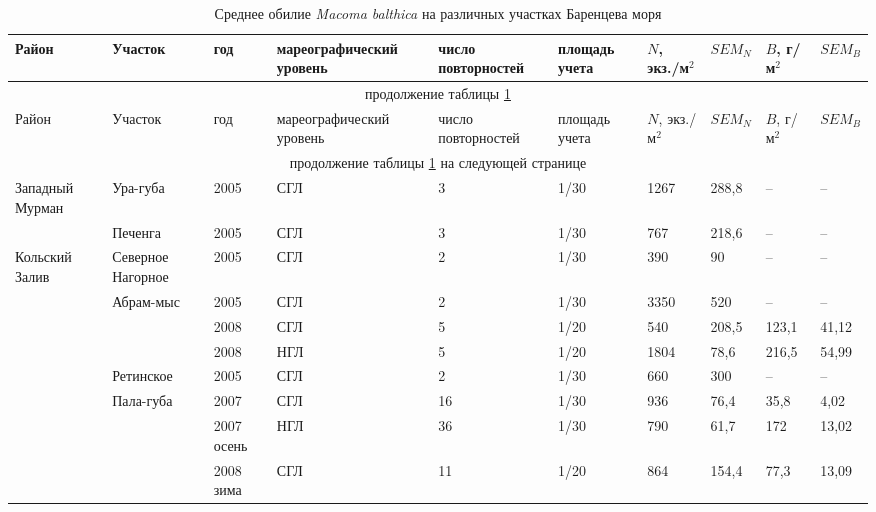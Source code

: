 	\begin{footnotesize}
        \begin{center}
	\begin{longtable}{|p{1.6cm}|p{2.3cm}|p{1cm}|p{1.6cm}|p{1.1cm}|p{1.1cm}|*{4}{p{1cm}|}}
	\caption{Среднее обилие {\it Macoma balthica} на различных участках Баренцева моря}\label{tab:mean_NB_Barents}\\
	\hline
	Район & Участок & год & ма\-ре\-ографи\-ческий уровень & число повторностей & пло\-щадь учета & $N$, экз./м$^2$ & $SEM_N$  & $B$, г/м$^2$ & $SEM_B$
	\\ \hline \endfirsthead
	\hline
	\multicolumn{10}{|c|}{продолжение таблицы \ref{tab:mean_NB_Barents}} \\ \hline
	Район & Участок & год & ма\-ре\-ографи\-ческий уровень & число повторностей & пло\-щадь учета & $N$, экз./м$^2$ & $SEM_N$  & $B$, г/м$^2$ & $SEM_B$
	\\ \hline \endhead
	\hline 
	\multicolumn{10}{|c|}{продолжение таблицы \ref{tab:mean_NB_Barents} на следующей странице}
	\\ \hline \endfoot
	\endlastfoot
Западный Мурман  & Ура-губа          & 2005       & СГЛ & 3  & 1/30 & 1267 & 288,8 & --    & --    \\ \cline{2-10}
                 & Печенга           & 2005       & СГЛ & 3  & 1/30 & 767  & 218,6 & --    & --    \\ \hline
Кольский Залив   & Северное Нагорное & 2005       & СГЛ & 2  & 1/30 & 390  & 90    & --    & --    \\ \cline{2-10}
                 & Абрам-мыс         & 2005       & СГЛ & 2  & 1/30 & 3350 & 520   & --    & --    \\
                 &                   & 2008       & СГЛ & 5  & 1/20 & 540  & 208,5 & 123,1 & 41,12 \\
                 &                   & 2008       & НГЛ & 5  & 1/20 & 1804 & 78,6  & 216,5 & 54,99 \\ \cline{2-10}
                 & Ретинское         & 2005       & СГЛ & 2  & 1/30 & 660  & 300   & --    & --    \\ \cline{2-10}
                 & Пала-губа         & 2007       & СГЛ & 16 & 1/30 & 936  & 76,4  & 35,8  & 4,02  \\
                 &                   & 2007 осень & НГЛ & 36 & 1/30 & 790  & 61,7  & 172   & 13,02 \\
                 &                   & 2008 зима  & СГЛ & 11 & 1/20 & 864  & 154,4 & 77,3  & 13,09 \\

\end{longtable}
\end{center}
\end{footnotesize}
